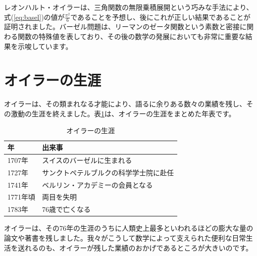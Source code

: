 \documentclass{ltjsarticle}
\begin{document}
レオンハルト・オイラーは、三角関数の無限乗積展開という巧みな手法により、式(\ref{eq:basel})の値が$\frac{\pi^2}{6}$であることを予想し、後にこれが正しい結果であることが証明されました。バーゼル問題は、リーマンのゼータ関数という素数と密接に関わる関数の特殊値を表しており、その後の数学の発展においても非常に重要な結果を示唆しています。

\section{オイラーの生涯}
オイラーは、その類まれなる才能により、語るに余りある数々の業績を残し、その激動の生涯を終えました。表\ref{tab:euler}は、オイラーの生涯をまとめた年表です。

\begin{table}[htbp]
\centering
\begin{tabular}{|l|l|}
\hline
年 & 出来事 \\ \hline \hline
1707年 & スイスのバーゼルに生まれる\\ \hline
1727年 & サンクトペテルブルクの科学学士院に赴任 \\ \hline
1741年 & ベルリン・アカデミーの会員となる \\ \hline
1771年頃 & 両目を失明 \\ \hline
1783年 & 76歳で亡くなる \\ \hline
\end{tabular}
\caption{オイラーの生涯}
\label{tab:euler}
\end{table}

オイラーは、その76年の生涯のうちに人類史上最多といわれるほどの膨大な量の論文や著書を残しました。我々がこうして数学によって支えられた便利な日常生活を送れるのも、オイラーが残した業績のおかげであるところが大きいのです。
\end{document}
